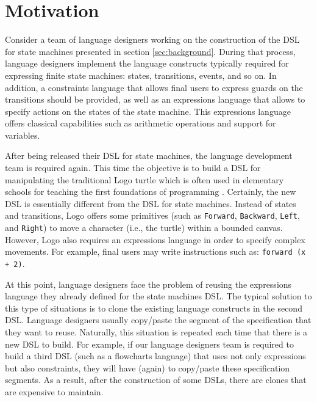 \section{Motivation}
\label{sec:motivation}

Consider a team of language designers working on the construction of the DSL for state machines presented in section \ref{sec:background}. During that process, language designers implement the language constructs typically required for expressing finite state machines: states, transitions, events, and so on. In addition, a constraints language that allows final users to express guards on the transitions should be provided, as well as an expressions language that allows to specify actions on the states of the state machine. This expressions language offers classical capabilities such as arithmetic operations and support for variables.

After being released their DSL for state machines, the language development team is required again. This time the objective is to build a DSL for manipulating the traditional Logo turtle which is often used in elementary schools for teaching the first foundations of programming \cite{Olson:1987}. Certainly, the new DSL is essentially different from the DSL for state machines. Instead of states and transitions, Logo offers some primitives (such as \texttt{Forward}, \texttt{Backward}, \texttt{Left}, and \texttt{Right}) to move a character (i.e., the turtle) within a bounded canvas. However, Logo also requires an expressions language in order to specify complex movements. For example, final users may write instructions such as: \texttt{forward (x + 2)}.

At this point, language designers face the problem of reusing the expressions language they already defined for the state machines DSL. The typical solution to this type of situations is to clone the existing language constructs in the second DSL. Language designers usually copy/paste the segment of the specification that they want to reuse. Naturally, this situation is repeated each time that there is a new DSL to build. For example, if our language designers team is required to build a third DSL (such as a flowcharts language) that uses not only expressions but also constraints, they will have (again) to copy/paste these specification segments. As a result, after the construction of some DSLs, there are clones that are expensive to maintain.


